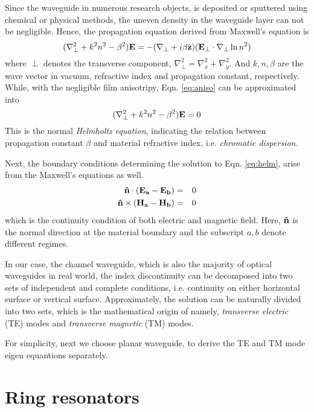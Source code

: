 \documentclass[final]{kuee_en}
\newcommand{\nosymbol}{}
\begin{document}
Since the waveguide in numerous research objects, is deposited or sputtered using chemical or physical methods, the uneven density in the waveguide layer can not be negligible. Hence, the propagation equation derived from Maxwell's equation is
\begin{equation}\label{eq:aniso}
  (\nabla_{\perp}^2 + k^2 n^2 - \beta^2) \vb{E} = - (\nabla_{\perp} + i
  \beta \hat{\vb{z}}) (\vb{E_{\perp}} \nosymbol \cdot \nabla_{\perp} \ln
  n^2)
\end{equation}
where $\perp$ denotes the transverse component, $\nabla_{\perp}^2 = \nabla_x^2 + \nabla_y^2$. And $k, n, \beta$ are the wave vector in vacuum, refractive index and propagation constant, respectively. While, with the negligible film anisotripy, Eqn. \ref{eq:aniso} can be approximated into
\begin{equation}\label{eq:helm}
  (\nabla_{\perp}^2 + k^2 n^2 - \beta^2) \vb{E} = 0
\end{equation}
This is the normal \textit{Helmholtz equation}, indicating the relation between propagation constant $\beta$ and material refractive index, i.e. \textit{chromatic dispersion}.

Next, the boundary conditions determining the solution to Eqn. \ref{eq:helm}, arise from the Maxwell's equations as well.
\begin{eqnarray}%
  \vb{\hat{n}} \cdot (\vb{E_a - E_b}) & = & 0 \\
  \vb{\hat{n}} \times (\vb{\vb{H_a} - H_{\vb{b}}}) & = & 0
\end{eqnarray}
which is the continuity condition of both electric and magnetic field. Here, $\vb{\hat{n}}$ is the normal direction at the material boundary and the subscript $a, b$ denote different regimes.

In our case, the channel waveguide, which is also the majority of optical waveguides in real world,
the index discontinuity can be decomposed into two sets of independent and complete conditions, i.e. continuity on either horizontal surface or vertical surface. Approximately, the solution can be naturally divided into two sets, which is the mathematical origin of namely,\textit{ transverse electric} (TE) modes and \textit{transverse magnetic} (TM) modes.

For simplicity, next we choose planar waveguide, to derive the TE and TM mode eigen equantions separately.

\section{Ring resonators}
\end{document}
